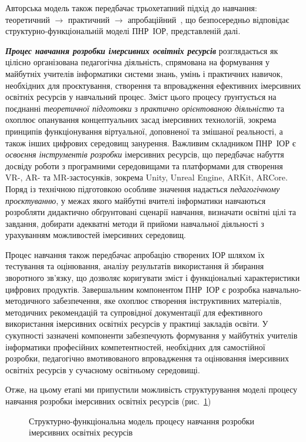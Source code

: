 Авторська модель також передбачає трьохетапний підхід до навчання: теоретичний $\to$ практичний $\to$ апробаційний~\cite{Semerikov2022IERDesign}, що безпосередньо відповідає структурно-функціональній моделі ПНР~ІОР, представленій далі.

\emph{\textbf{Процес навчання розробки імерсивних освітніх ресурсів}} розглядається як цілісно організована педагогічна діяльність, спрямована на формування у майбутніх учителів інформатики системи знань, умінь і практичних навичок, необхідних для проєктування, створення та впровадження ефективних імерсивних освітніх ресурсів у навчальний процес. Зміст цього процесу ґрунтується на поєднанні \emph{теоретичної підготовки} з \emph{практично орієнтованою діяльністю} та охоплює опанування концептуальних засад імерсивних технологій, зокрема принципів функціонування віртуальної, доповненої та змішаної реальності, а також інших цифрових середовищ занурення. Важливим складником ПНР~ІОР є \emph{освоєння інструментів розробки} імерсивних ресурсів, що передбачає набуття досвіду роботи з програмними середовищами та платформами для створення VR-, AR- та MR-застосунків, зокрема Unity, Unreal Engine, ARKit, ARCore. Поряд із технічною підготовкою особливе значення надається \emph{педагогічному проєктуванню}, у межах якого майбутні вчителі інформатики навчаються розробляти дидактично обґрунтовані сценарії навчання, визначати освітні цілі та завдання, добирати адекватні методи й прийоми навчальної діяльності з урахуванням можливостей імерсивних середовищ.

Процес навчання також передбачає апробацію створених ІОР шляхом їх тестування та оцінювання, аналізу результатів використання й збирання зворотного зв'язку, що дозволяє коригувати зміст і функціональні характеристики цифрових продуктів. Завершальним компонентом ПНР~ІОР є розробка навчально-методичного забезпечення, яке охоплює створення інструктивних матеріалів, методичних рекомендацій та супровідної документації для ефективного використання імерсивних освітніх ресурсів у практиці закладів освіти. У сукупності зазначені компоненти забезпечують формування у майбутніх учителів інформатики професійних компетентностей, необхідних для самостійної розробки, педагогічно вмотивованого впровадження та оцінювання імерсивних освітніх ресурсів у сучасному освітньому середовищі.

Отже, на цьому етапі ми припустили можливість структурування моделі процесу навчання розробки імерсивних освітніх ресурсів (рис.~\ref{fig:1.5})

\begin{figure}[!h]
\centering

\caption{Структурно-функціональна модель процесу навчання розробки імерсивних освітніх ресурсів}
\label{fig:1.5}
\end{figure}

